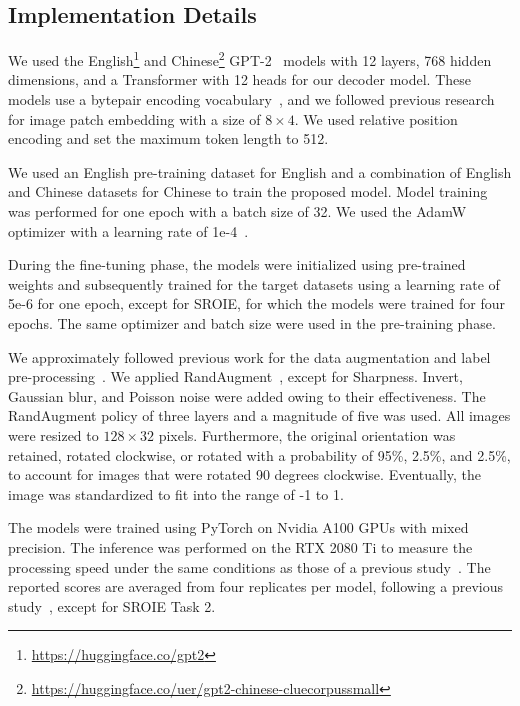 \documentclass[10pt,twocolumn,letterpaper]{article}
\begin{document}
\subsection{Implementation Details}

We used the English\footnote{\url{https://huggingface.co/gpt2}} and Chinese\footnote{\url{https://huggingface.co/uer/gpt2-chinese-cluecorpussmall}} GPT-2~\cite{radford2019language} models with 12 layers, 768 hidden dimensions, and a Transformer with 12 heads for our decoder model.
These models use a bytepair encoding vocabulary~\cite{sennrich2016bpe}, and we followed previous research~\cite{bautista2022parseq} for image patch embedding with a size of $8 \times 4$. 
We used relative position encoding and set the maximum token length to 512.



We used an English pre-training dataset for English and a combination of English and Chinese datasets for Chinese to train the proposed model. 
Model training was performed for one epoch with a batch size of 32.
We used the AdamW optimizer with a learning rate of 1e-4~\cite{loshchilov2018adamw}.



During the fine-tuning phase, the models were initialized using pre-trained weights and subsequently trained for the target datasets using a learning rate of 5e-6 for one epoch, except for SROIE, for which the models were trained for four epochs.
The same optimizer and batch size were used in the pre-training phase.


We approximately followed previous work for the data augmentation and label pre-processing~\cite{bautista2022parseq}.
We applied RandAugment~\cite{cubuk2020randaugment}, except for Sharpness.
Invert, Gaussian blur, and Poisson noise were added owing to their effectiveness.
The RandAugment policy of three layers and a magnitude of five was used.
All images were resized to $128 \times 32$ pixels.
Furthermore, the original orientation was retained, rotated clockwise, or rotated with a probability of 95\%, 2.5\%, and 2.5\%, to account for images that were rotated 90 degrees clockwise. 
Eventually, the image was standardized to fit into the range of -1 to 1.

The models were trained using PyTorch on Nvidia A100 GPUs with mixed precision. 
The inference was performed on the RTX 2080 Ti to measure the processing speed under the same conditions as those of a previous study~\cite{yu2021btcr}. The reported scores are averaged from four replicates per model, following a previous study~\cite{bautista2022parseq}, except for SROIE Task 2.
\end{document}
